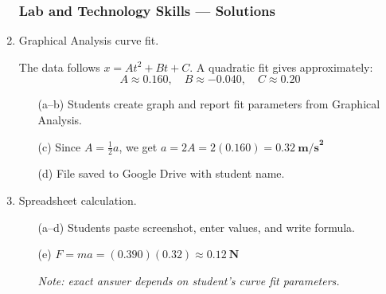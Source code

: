 \documentclass[12pt, twoside]{article}
\begin{document}
\begin{enumerate}[itemsep=0.25cm]
\subsubsection*{Lab and Technology Skills --- Solutions}

\item Graphical Analysis curve fit.

The data follows $x = At^2 + Bt + C$. A quadratic fit gives approximately:
$$A \approx 0.160, \quad B \approx -0.040, \quad C \approx 0.20$$

  \begin{enumerate}[itemsep=0.5cm]
    \item[(a--b)] Students create graph and report fit parameters from Graphical Analysis.
    \item[(c)] Since $A = \frac{1}{2}a$, we get $a = 2A = 2(0.160) = \mathbf{0.32~\textbf{m/s}^2}$
    \item[(d)] File saved to Google Drive with student name.
  \end{enumerate}
  \vspace{0.25cm}

\item Spreadsheet calculation.
  \begin{enumerate}[itemsep=0.25cm]
    \item[(a--d)] Students paste screenshot, enter values, and write formula.
    \item[(e)] $F = ma = (0.390)(0.32) \approx \mathbf{0.12~\textbf{N}}$

    \textit{Note: exact answer depends on student's curve fit parameters.}
  \end{enumerate}

\end{enumerate}
\end{document}
